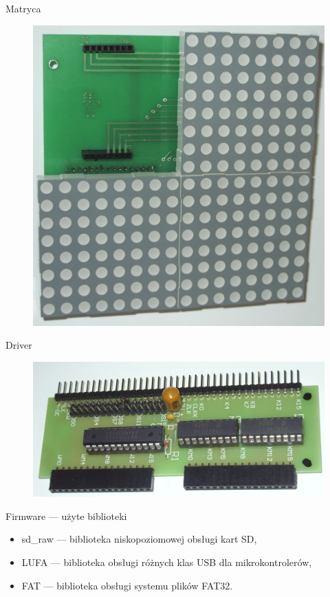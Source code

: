 \documentclass{beamer}
\begin{document}
\begin{frame}{Matryca}
	\begin{figure}[h]
		\centering
		\includegraphics[scale=0.09]{img/matryca.jpg}
	\end{figure}
\end{frame}

\begin{frame}{Driver}
	\begin{figure}[h]
		\centering
		\includegraphics[width=\textwidth]{img/zdj-driver.jpg}
	\end{figure}
\end{frame}

\begin{frame}{Firmware --- użyte biblioteki}
	\begin{itemize}
		\item sd\_raw --- biblioteka niskopoziomowej obsługi kart SD,
		\item LUFA --- biblioteka obsługi różnych klas USB dla mikrokontrolerów,
		\item FAT --- biblioteka obsługi systemu plików FAT32.
	\end{itemize}
\end{frame}
\end{document}
